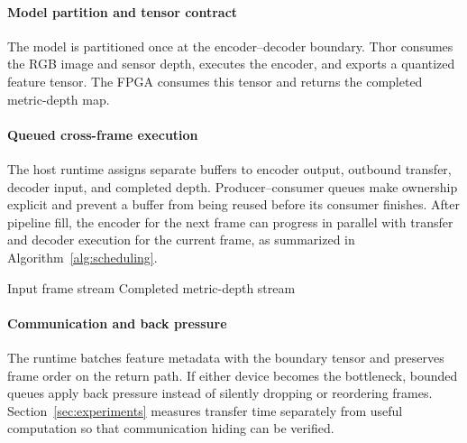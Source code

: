\paragraph{Model partition and tensor contract}
The model is partitioned once at the encoder--decoder boundary.  Thor consumes
the RGB image and sensor depth, executes the encoder, and exports a quantized
feature tensor.  The FPGA consumes this tensor and returns the completed
metric-depth map.

\paragraph{Queued cross-frame execution}
The host runtime assigns separate buffers to encoder output, outbound
transfer, decoder input, and completed depth.  Producer--consumer queues make
ownership explicit and prevent a buffer from being reused before its consumer
finishes.  After pipeline fill, the encoder for the next frame can progress in
parallel with transfer and decoder execution for the current frame, as
summarized in Algorithm~\ref{alg:scheduling}.

\begin{algorithm}[b]
  \caption{Heterogeneous scheduling (placeholder)}
  \label{alg:scheduling}
  \begin{algorithmic}[1]
    \Require Input frame stream \pending
    \Ensure Completed metric-depth stream \pending
      \State \pending
    \EndFor
  \end{algorithmic}
\end{algorithm}

\paragraph{Communication and back pressure}
The runtime batches feature metadata with the boundary tensor and preserves
frame order on the return path.  If either device becomes the bottleneck,
bounded queues apply back pressure instead of silently dropping or reordering
frames.  Section~\ref{sec:experiments} measures transfer time separately from
useful computation so that communication hiding can be verified.
